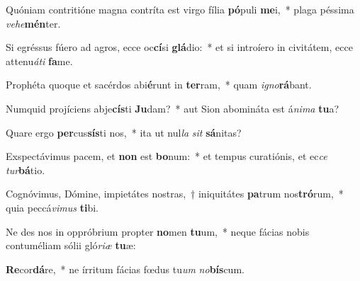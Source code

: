 \item Quóniam contritióne magna contríta est virgo fília \textbf{pó}puli \textbf{me}i,~* plaga péssima \textit{ve}\textit{he}\textbf{mén}ter.
\item Si egréssus fúero ad agros, ecce oc\textbf{cí}si \textbf{glá}dio:~* et si introíero in civitátem, ecce attenu\textit{á}\textit{ti} \textbf{fa}me.
\item Prophéta quoque et sacérdos abi\textbf{é}runt in \textbf{ter}ram,~* quam \textit{i}\textit{gno}\textbf{rá}bant.
\item Numquid projíciens abje\textbf{cís}ti \textbf{Ju}dam?~* aut Sion abomináta est á\textit{ni}\textit{ma} \textbf{tu}a?
\item Quare ergo \textbf{per}cus\textbf{sís}ti nos,~* ita ut nul\textit{la} \textit{sit} \textbf{sá}nitas?
\item Exspectávimus pacem, et \textbf{non} est \textbf{bo}num:~* et tempus curatiónis, et ec\textit{ce} \textit{tur}\textbf{bá}tio.
\item Cognóvimus, Dómine, impietátes nostras,~† iniquitátes \textbf{pa}trum nos\textbf{tró}rum,~* quia peccá\textit{vi}\textit{mus} \textbf{ti}bi.
\item Ne des nos in oppróbrium propter \textbf{no}men \textbf{tu}um,~* neque fácias nobis contuméliam sólii gló\textit{ri}\textit{æ} \textbf{tu}æ:
\item \textbf{Re}cor\textbf{dá}re,~* ne írritum fácias fœdus tu\textit{um} \textit{no}\textbf{bís}cum.
